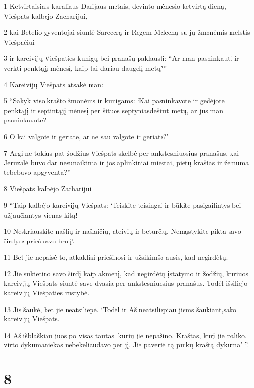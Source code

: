 \par 1 Ketvirtaisiais karaliaus Darijaus metais, devinto mėnesio ketvirtą dieną, Viešpats kalbėjo Zacharijui, 
\par 2 kai Betelio gyventojai siuntė Sarecerą ir Regem Melechą su jų žmonėmis melstis Viešpačiui 
\par 3 ir kareivijų Viešpaties kunigų bei pranašų paklausti: “Ar man pasninkauti ir verkti penktąjį mėnesį, kaip tai dariau daugelį metų?” 
\par 4 Kareivijų Viešpats atsakė man: 
\par 5 “Sakyk viso krašto žmonėms ir kunigams: ‘Kai pasninkavote ir gedėjote penktąjį ir septintąjį mėnesį per šituos septyniasdešimt metų, ar jūs man pasninkavote? 
\par 6 O kai valgote ir geriate, ar ne sau valgote ir geriate?’ 
\par 7 Argi ne tokius pat žodžius Viešpats skelbė per ankstesniuosius pranašus, kai Jeruzalė buvo dar nesunaikinta ir jos aplinkiniai miestai, pietų kraštas ir žemuma tebebuvo apgyventa?” 
\par 8 Viešpats kalbėjo Zacharijui: 
\par 9 “Taip kalbėjo kareivijų Viešpats: ‘Teiskite teisingai ir būkite pasigailintys bei užjaučiantys vienas kitą! 
\par 10 Neskriauskite našlių ir našlaičių, ateivių ir beturčių. Nemąstykite pikta savo širdyse prieš savo brolį’. 
\par 11 Bet jie nepaisė to, atkakliai priešinosi ir užsikimšo ausis, kad negirdėtų. 
\par 12 Jie sukietino savo širdį kaip akmenį, kad negirdėtų įstatymo ir žodžių, kuriuos kareivijų Viešpats siuntė savo dvasia per ankstesniuosius pranašus. Todėl išsiliejo kareivijų Viešpaties rūstybė. 
\par 13 Jis šaukė, bet jie neatsiliepė. ‘Todėl ir Aš neatsiliepiau jiems šaukiant,­sako kareivijų Viešpats.­ 
\par 14 Aš išblaškiau juos po visas tautas, kurių jie nepažino. Kraštas, kurį jie paliko, virto dykuma­niekas nebekeliaudavo per jį. Jie pavertė tą puikų kraštą dykuma’ ”.



\chapter{8}


